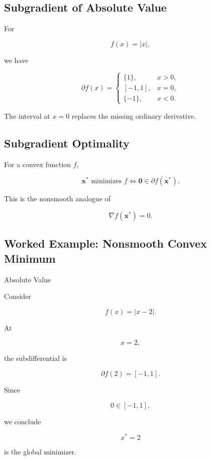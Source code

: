 \subsection{Subgradient of Absolute Value}
\label{subsec:subgradient-absolute-value}

For

\[
f(x)=|x|,
\]

we have

\[
\boxed{
\partial f(x)
=
\begin{cases}
\{1\},
&
x>0,
\\
[-1,1],
&
x=0,
\\
\{-1\},
&
x<0.
\end{cases}
}
\]

The interval at \(x=0\) replaces the missing ordinary derivative.

\subsection{Subgradient Optimality}
\label{subsec:subgradient-optimality}

For a convex function \(f\),

\[
\boxed{
\mathbf{x}^*
\text{ minimizes }f
\iff
\mathbf{0}
\in
\partial f(\mathbf{x}^*).
}
\]

This is the nonsmooth analogue of

\[
\nabla f(\mathbf{x}^*)=0.
\]

\subsection{Worked Example: Nonsmooth Convex Minimum}
\label{subsec:worked-subgradient-minimum}

\begin{workedexamplebox}{Absolute Value}

Consider

\[
f(x)=|x-2|.
\]

At

\[
x=2,
\]

the subdifferential is

\[
\partial f(2)
=
[-1,1].
\]

Since

\[
0\in[-1,1],
\]

we conclude

\begin{answerbox}
\[
\boxed{
x^*=2
}
\]

is the global minimizer.
\end{answerbox}

\end{workedexamplebox}

